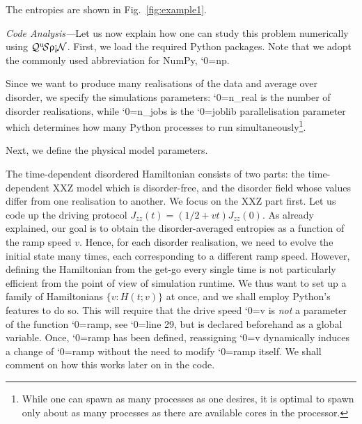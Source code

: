 \documentclass{SciPost}
\newcommand\0{\scalebox{-1}[1]{0}}
\let\svttfamily\ttfamily
\renewcommand\ttfamily{\svttfamily\catcode`0=\active }
\renewcommand\texttt{\bgroup\ttfamily\texttthelp}
\def\texttthelp#1{#1\egroup}
\newcommand{\qspin}{$\mathcal{Q}^{\mathrm{u}}\!\mathcal{S}\uprho\mathrm{\text{\textexclamdown}}\mathcal{N}$}
\begin{document}
The entropies are shown in Fig.~\ref{fig:example1}.


\emph{Code Analysis---}Let us now explain how one can study this problem numerically using \qspin. First, we load the required Python packages. Note that we adopt the commonly used abbreviation for NumPy, \texttt{np}. 

%
Since we want to produce many realisations of the data and average over disorder, we specify the simulations parameters: \texttt{n\_real} is the number of disorder realisations, while \texttt{n\_jobs} is the \texttt{joblib} parallelisation parameter which determines how many Python processes to run simultaneously\footnote{While one can spawn as many processes as one desires, it is optimal to spawn only about as many processes as there are available cores in the processor.}.

%
Next, we define the physical model parameters.  

%
The time-dependent disordered Hamiltonian consists of two parts: the time-dependent XXZ model which is disorder-free, and the disorder field whose values differ from one realisation to another. We focus on the XXZ part first. Let us code up the driving protocol $J_{zz}(t) = (1/2 + vt)J_{zz}(0)$. As already explained, our goal is to obtain the disorder-averaged entropies as a function of the ramp speed $v$. Hence, for each disorder realisation, we need to evolve the initial state many times, each corresponding to a different ramp speed. However, defining the Hamiltonian from the get-go every single time is not particularly efficient from the point of view of simulation runtime. We thus want to set up a family of Hamiltonians $\{v:H(t;v)\}$ at once, and we shall employ Python's features to do so. This will require that the drive speed \texttt{v} is \emph{not} a parameter of the function \texttt{ramp}, see \texttt{line 29}, but is declared beforehand as a global variable. Once, \texttt{ramp} has been defined, reassigning \texttt{v} dynamically induces a change of \texttt{ramp} without the need to modify \texttt{ramp} itself. We shall comment on how this works later on in the code.   

%
\end{document}
